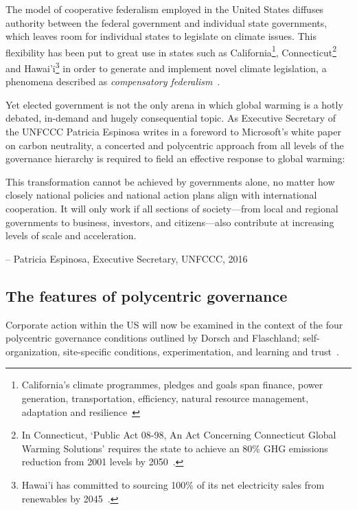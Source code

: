 The model of cooperative federalism employed in the United States
diffuses authority between the federal government and individual state
governments, which leaves room for individual states to legislate on
climate issues. This flexibility has been put to great use in states
such as California\footnote{California's climate programmes, pledges
  and goals span finance, power generation, transportation,
  efficiency, natural resource management, adaptation and
  resilience~\citep{wearestillin-california}}, Connecticut\footnote{In
  Connecticut, `Public Act 08-98, An Act Concerning Connecticut Global
  Warming Solutions' requires the state to achieve an 80\% GHG
  emissions reduction from 2001 levels by
  2050~\citep{wearestillin-connecticut}.}  and Hawai'i\footnote{Hawai'i
  has committed to sourcing 100\% of its net electricity sales from
  renewables by 2045~\citep{wearestillin-hawaii}.} in order to generate
and implement novel climate legislation, a phenomena described as
\textit{compensatory federalism}~\citep{balthasar2019energy}.

Yet elected government is not the only arena in which global warming
is a hotly debated, in-demand and hugely consequential topic. As
Executive Secretary of the UNFCCC Patricia Espinosa writes in a
foreword to Microsoft's white paper on carbon neutrality, a concerted
and polycentric approach from all levels of the governance hierarchy
is required to field an effective response to global warming:

\begin{displayquote}
  This transformation cannot be achieved by governments alone, no
  matter how closely national policies and national action plans align
  with international cooperation. It will only work if all sections of
  society—from local and regional governments to business, investors,
  and citizens—also contribute at increasing levels of scale and
  acceleration.

  -- Patricia Espinosa, Executive Secretary, UNFCCC,
  2016~\citep{microsoft2015}
\end{displayquote}

\subsection{The features of polycentric governance}

Corporate action within the US will now be examined in the context of
the four polycentric governance conditions outlined by Dorsch and
Flaschland; self-organization, site-specific conditions,
experimentation, and learning and trust~\citep{dorsch2017polycentric}.

